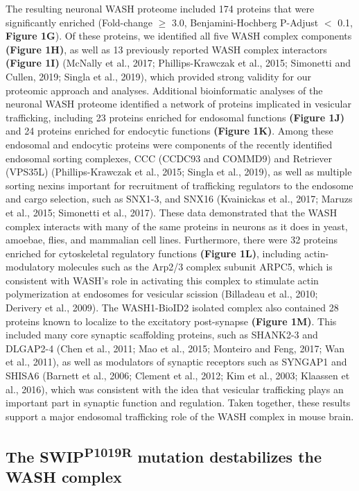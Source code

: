 The resulting neuronal WASH proteome included 174 proteins that were
significantly enriched (Fold-change $\geq$ 3.0, Benjamini-Hochberg P-Adjust $<$ 0.1,
\textbf{Figure 1G}). Of these proteins, we identified all five WASH complex components
\textbf{(Figure 1H)}, as well as 13 previously reported WASH complex interactors 
\textbf{(Figure 1I)} (McNally et al., 2017; Phillips-Krawczak et al., 2015; Simonetti and
Cullen, 2019; Singla et al., 2019), which provided strong validity for our
proteomic approach and analyses. Additional bioinformatic analyses of the
neuronal WASH proteome identified a network of proteins implicated in vesicular
trafficking, including 23 proteins enriched for endosomal functions \textbf{(Figure 1J)}
and 24 proteins enriched for endocytic functions \textbf{(Figure 1K)}. Among these
endosomal and endocytic proteins were components of the recently identified
endosomal sorting complexes, CCC (CCDC93 and COMMD9) and Retriever (VPS35L)
(Phillips-Krawczak et al., 2015; Singla et al., 2019), as well as multiple
sorting nexins important for recruitment of trafficking regulators to the
endosome and cargo selection, such as SNX1-3, and SNX16 (Kvainickas et al.,
2017; Maruzs et al., 2015; Simonetti et al., 2017). These data demonstrated that
the WASH complex interacts with many of the same proteins in neurons as it does
in yeast, amoebae, flies, and mammalian cell lines. Furthermore, there were 32
proteins enriched for cytoskeletal regulatory functions \textbf{(Figure 1L)}, including
actin-modulatory molecules such as the Arp2/3 complex subunit ARPC5, which is
consistent with WASH’s role in activating this complex to stimulate actin
polymerization at endosomes for vesicular scission (Billadeau et al., 2010;
Derivery et al., 2009). The WASH1-BioID2 isolated complex also contained 28
proteins known to localize to the excitatory post-synapse \textbf{(Figure 1M)}. This
included many core synaptic scaffolding proteins, such as SHANK2-3 and DLGAP2-4
(Chen et al., 2011; Mao et al., 2015; Monteiro and Feng, 2017; Wan et al.,
2011), as well as modulators of synaptic receptors such as SYNGAP1 and SHISA6
(Barnett et al., 2006; Clement et al., 2012; Kim et al., 2003; Klaassen et al.,
2016), which was consistent with the idea that vesicular trafficking plays an
important part in synaptic function and regulation. Taken together, these
results support a major endosomal trafficking role of the WASH complex in mouse
brain. 

\subsection{The SWIP\textsuperscript{P1019R} mutation destabilizes the WASH complex}

